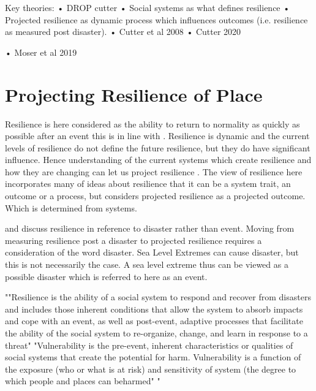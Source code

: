 Key theories:
•	DROP cutter
•	Social systems as what defines resilience
•	Projected resilience as dynamic process which influences outcomes (i.e. resilience as measured post disaster). 
•	Cutter et al 2008
•	Cutter 2020 


•	Moser et al 2019 



\section{Projecting Resilience of Place} 
Resilience is here considered as the ability to return to normality as quickly as possible after an event this is in line with \cite{cutter_place-based_2008}. Resilience is dynamic and the current levels of resilience do not define the future resilience, but they do have significant influence. Hence understanding of the current systems which create resilience and how they are changing can let us project resilience \cite{cutter_community_2020}. The view of resilience here incorporates many of \cite{moser_turbulent_2019} ideas about resilience that it can be a system trait, an outcome or a process, but considers projected resilience as a projected outcome. Which is determined from systems. 

\cite{cutter_place-based_2008} and \cite{cutter_community_2020} discuss resilience in reference to disaster rather than event. Moving from measuring resilience post a disaster to projected resilience requires a consideration of the word disaster. Sea Level Extremes can cause disaster, but this is not necessarily the case. A sea level extreme thus can be viewed as a possible disaster which is referred to here as an event. 

""Resilience is the ability of a social system to respond and recover from disasters and includes those inherent conditions that allow the system to absorb impacts and cope with an event, as well as post-event, adaptive processes that facilitate the ability of the social system to re-organize, change, and learn in response to a threat" "Vulnerability is the pre-event, inherent characteristics or qualities of social systems that create the potential for harm. Vulnerability is a function of the exposure (who or what is at risk) and sensitivity of system (the degree to which people and places can beharmed" " \cite{cutter_place-based_2008}

